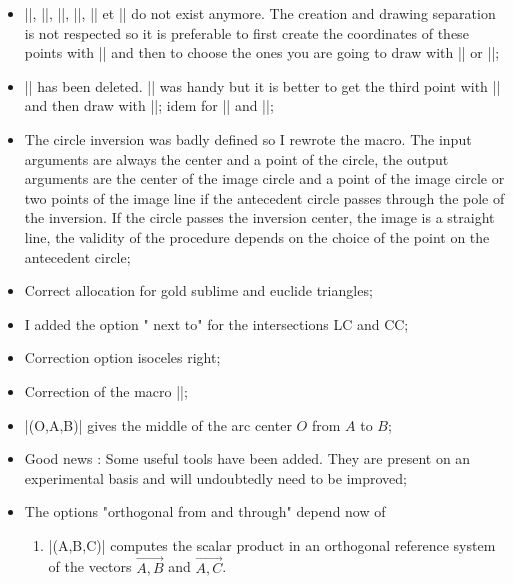 \begin{itemize}
 \item  |\tkzDrawMedian|, |\tkzDrawBisector|, |\tkzDrawAltitude|, |\tkzDrawMedians|, |\tkzDrawBisectors| et  |\tkzDrawAltitudes| do not exist anymore. The creation and drawing separation is not respected so it is preferable to first create the coordinates of these points with |\tkzDefSpcTriangle[median]| and then to choose the ones you are going to draw with |\tkzDrawSegments| or |\tkzDrawLines|;
 
\item |\tkzDrawTriangle| has been deleted.  |\tkzDrawTriangle[equilateral]| was handy but it is better to get the third point with |\tkzDefTriangle[equilateral]| and then draw with |\tkzDrawPolygon|; idem for |\tkzDrawSquare| and |\tkzDrawGoldRectangle|; 


\item The circle inversion was badly defined so I rewrote the macro. The input arguments are always the center and a point of the circle, the output arguments are the center of the image circle and a point of the image circle or two points of the image line if the antecedent circle passes through the pole of the inversion. If the circle passes the inversion center, the image is a straight line, the validity of the procedure depends on the choice of the point on the antecedent circle; 

\item Correct allocation for gold sublime and euclide triangles;


\item I added the option " next to" for the intersections LC and CC;


\item Correction option isoceles right;

\item Correction of the macro |\tkzMarkAngle|;


\item |\tkzDefMidArc(O,A,B)| gives the middle of the arc center $O$ from $A$ to $B$; 

\item Good news : Some useful tools have been added. They are present on an experimental basis and will undoubtedly need to be improved;


\item The options "orthogonal from and through" depend now of 

\begin{enumerate}
  
  \item |\tkzDotProduct(A,B,C)| computes the scalar product in an orthogonal reference system of the vectors $\overrightarrow{A,B}$ and $\overrightarrow{A,C}$. 
  

\end{enumerate}
\end{itemize}
